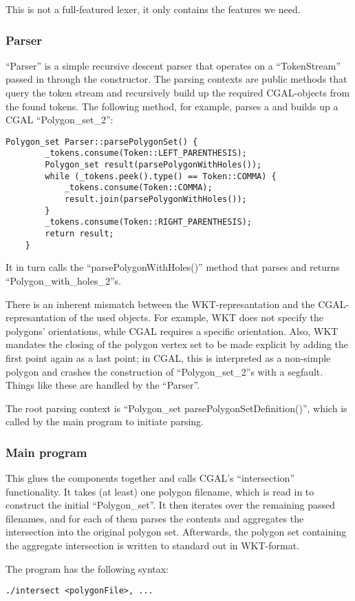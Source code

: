 This is not a full-featured lexer, it only contains the features we need.

\subsubsection{Parser}

``Parser'' is a simple recursive descent parser that operates on a ``TokenStream'' passed in through the constructor.
The parsing contexts are public methods that query the token stream and recursively build up the required CGAL-objects
from the found tokens.
The following method, for example, parses a and builds up a CGAL ``Polygon\_set\_2'':

\begin{lstlisting}[numbers=none]
    Polygon_set Parser::parsePolygonSet() {
        _tokens.consume(Token::LEFT_PARENTHESIS);
        Polygon_set result(parsePolygonWithHoles());
        while (_tokens.peek().type() == Token::COMMA) {
            _tokens.consume(Token::COMMA);
            result.join(parsePolygonWithHoles());
        }
        _tokens.consume(Token::RIGHT_PARENTHESIS);
        return result;
    }
\end{lstlisting}
    
It in turn calls the ``parsePolygonWithHoles()'' method that parses and returns ``Polygon\_with\_holes\_2''s.

There is an inherent mismatch between the WKT-represantation and the CGAL-represantation of the used objects.
For example, WKT does not specify the polygons' orientations, while CGAL requires a specific orientation.
Also, WKT mandates the closing of the polygon vertex set to be made explicit by adding the first point again as
a last point; in CGAL, this is interpreted as a non-simple polygon and crashes the construction of
``Polygon\_set\_2''s with a segfault. Things like these are handled by the ``Parser''.

The root parsing context is ``Polygon\_set parsePolygonSetDefinition()'', which is called by the main program
to initiate parsing.

\subsubsection{Main program}

This glues the components together and calls CGAL's ``intersection'' functionality.
It takes (at least) one polygon filename, which is read in to construct the initial ``Polygon\_set''. It then
iterates over the remaining passed filenames, and for each of them parses the contents and aggregates the intersection
into the original polygon set. Afterwards, the polygon set containing the aggregate intersection is written to
standard out in WKT-format.

The program has the following syntax:

\begin{lstlisting}[numbers=none]
./intersect <polygonFile>, ...
\end{lstlisting}
